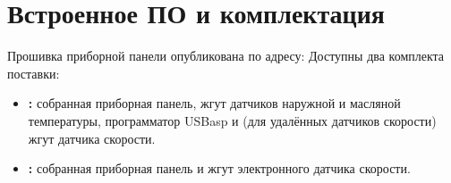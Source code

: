 \section{Встроенное ПО и комплектация}
Прошивка приборной панели опубликована по адресу:
Доступны два комплекта поставки:
\begin{itemize}
    \item \textbf{\ReplicaGenOne{}:} собранная приборная панель, жгут датчиков наружной и масляной температуры, программатор USBasp и (для удалённых датчиков скорости) жгут датчика скорости.
    \item \textbf{\ReplicaNextLong{}:} собранная приборная панель и жгут электронного датчика скорости.
\end{itemize}
